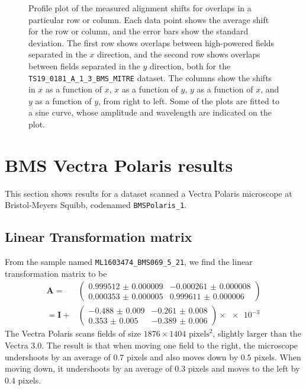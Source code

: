 \documentclass{article}
\newcommand{\matrixbold}[1]{\mathbf{#1}}
\begin{document}
\begin{figure}[ht]
\begin{subfigure}{0.24\linewidth}
		\caption{}
		\label{fig:sinewave4yyJHUPolaris}
	\end{subfigure}
	\caption{Profile plot of the measured alignment shifts for overlaps in a particular row or column.  Each data point shows the average shift for the row or column, and the error bars show the standard deviation.  The first row shows overlaps between high-powered fields separated in the $x$ direction, and the second row shows overlaps between fields separated in the $y$ direction, both for the \texttt{TS19\_0181\_A\_1\_3\_BMS\_MITRE} dataset.  The columns show the shifts in $x$ as a function of $x$, $x$ as a function of $y$, $y$ as a function of $x$, and $y$ as a function of $y$, from right to left.  Some of the plots are fitted to a sine curve, whose amplitude and wavelength are indicated on the plot.}
	\label{fig:sinewavesJHUPolaris}
\end{figure}

\clearpage

\section{BMS Vectra Polaris results}

This section shows results for a dataset scanned a Vectra Polaris microscope at Bristol-Meyers Squibb, codenamed \texttt{BMSPolaris\_1}.

\subsection{Linear Transformation matrix}

From the sample named \texttt{ML1603474\_BMS069\_5\_21}, we find the linear transformation matrix to be
\begin{align}
\matrixbold{A}=&\begin{pmatrix}
\num{0.999512(9)} &
\num{-0.000261(8)} \\
\num{0.000353(5)} &
\num{0.999611(6)}
\end{pmatrix} \\
=\matrixbold{I} + &\begin{pmatrix}
\num{-0.488(9)} &
\num{-0.261(8)} \\
\num{0.353(5)} &
\num{-0.389(6)}
\end{pmatrix} \times \num{e-3}
\label{eq:Amatrix_ML1603474_BMS069_5_21}
\end{align}
The Vectra Polaris scans fields of size $1876\times1404$ $\text{pixels}^2$, slightly larger than the Vectra 3.0.  The result is that when moving one field to the right, the microscope undershoots by an average of $0.7$ pixels and also moves down by $0.5$ pixels.  When moving down, it undershoots by an average of $0.3$ pixels and moves to the left by $0.4$ pixels.
\end{document}
